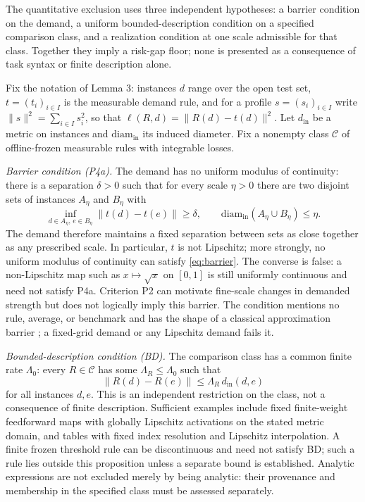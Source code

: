 \documentclass[twoside,11pt]{article}
\begin{document}
The quantitative exclusion uses three independent hypotheses: a barrier condition on the demand, a uniform bounded-description condition on a specified comparison class, and a realization condition at one scale admissible for that class. Together they imply a risk-gap floor; none is presented as a consequence of task syntax or finite description alone.

Fix the notation of Lemma 3: instances $d$ range over the open test set, $t=(t_i)_{i\in I}$ is the measurable demand rule, and for a profile $s=(s_i)_{i\in I}$ write $\|s\|^2=\sum_{i\in I}s_i^2$, so that $\ell(R,d)=\|R(d)-t(d)\|^2$. Let $d_{\mathrm{in}}$ be a metric on instances and $\mathrm{diam}_{\mathrm{in}}$ its induced diameter. Fix a nonempty class $\mathcal{C}$ of offline-frozen measurable rules with integrable losses.

\emph{Barrier condition (P4a).} The demand has no uniform modulus of continuity: there is a separation $\delta>0$ such that for every scale $\eta>0$ there are two disjoint sets of instances $A_\eta$ and $B_\eta$ with
\begin{equation}
\inf_{d\in A_\eta,\,e\in B_\eta}\|t(d)-t(e)\|\geq\delta, \qquad \mathrm{diam}_{\mathrm{in}}(A_\eta\cup B_\eta)\leq\eta .
\label{eq:barrier}%
\end{equation}%
The demand therefore maintains a fixed separation between sets as close together as any prescribed scale. In particular, $t$ is not Lipschitz; more strongly, no uniform modulus of continuity can satisfy \eqref{eq:barrier}. The converse is false: a non-Lipschitz map such as $x\mapsto\sqrt{x}$ on $[0,1]$ is still uniformly continuous and need not satisfy P4a. Criterion P2 can motivate fine-scale changes in demanded strength but does not logically imply this barrier. The condition mentions no rule, average, or benchmark and has the shape of a classical approximation barrier \citep{kolmogorov1936,pinkus1985}; a fixed-grid demand or any Lipschitz demand fails it.

\emph{Bounded-description condition (BD).} The comparison class has a common finite rate $\Lambda_0$: every $R\in\mathcal{C}$ has some $\Lambda_R\leq\Lambda_0$ such that
\begin{equation}
\|R(d)-R(e)\|\leq\Lambda_R\,d_{\mathrm{in}}(d,e)
\label{eq:rate}%
\end{equation}%
for all instances $d,e$. This is an independent restriction on the class, not a consequence of finite description. Sufficient examples include fixed finite-weight feedforward maps with globally Lipschitz activations on the stated metric domain, and tables with fixed index resolution and Lipschitz interpolation. A finite frozen threshold rule can be discontinuous and need not satisfy BD; such a rule lies outside this proposition unless a separate bound is established. Analytic expressions are not excluded merely by being analytic: their provenance and membership in the specified class must be assessed separately.
\end{document}
